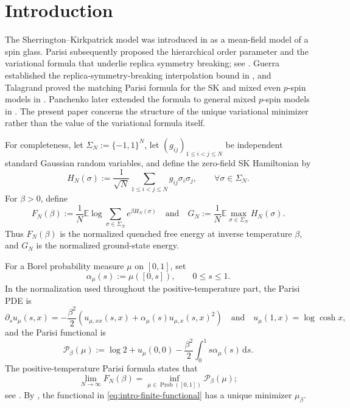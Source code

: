 \documentclass[10pt]{amsart}
\theoremstyle{definition}
\theoremstyle{remark}
\numberwithin{equation}{section}
\newcommand{\E}{\mathbb E}
\newcommand{\1}{\mathbf 1}
\newcommand{\dd}{\,\mathrm d}
\begin{document}
\enlargethispage{8pt}
\tableofcontents

\section{Introduction}
\label{sec:introduction}

The Sherrington--Kirkpatrick model was introduced in \cite{SherringtonKirkpatrick1975} as a mean-field model of a spin glass. Parisi subsequently proposed the hierarchical order parameter and the variational formula that underlie replica symmetry breaking; see \cite{Parisi1979}. Guerra established the replica-symmetry-breaking interpolation bound in \cite[Theorem 3]{Guerra2003}, and Talagrand proved the matching Parisi formula for the SK and mixed even $p$-spin models in \cite[Theorem 1.1]{Talagrand2006}. Panchenko later extended the formula to general mixed $p$-spin models in \cite[Theorem 1]{Panchenko2014}. The present paper concerns the structure of the unique variational minimizer rather than the value of the variational formula itself.

For completeness, let $\Sigma_N:=\{-1,1\}^N$, let $(g_{ij})_{1\leq i<j\leq N}$ be independent standard Gaussian random variables, and define the zero-field SK Hamiltonian by
\begin{equation*}
 H_N(\sigma):=\frac1{\sqrt N}\sum_{1\leq i<j\leq N}g_{ij}\sigma_i\sigma_j,
 \qquad \forall\sigma\in\Sigma_N.
\end{equation*}
For $\beta>0$, define
\begin{equation*}
 F_N(\beta):=\frac1N\E\log\sum_{\sigma\in\Sigma_N}e^{\beta H_N(\sigma)}
 \quad\text{and}\quad
 G_N:=\frac1N\E\max_{\sigma\in\Sigma_N}H_N(\sigma).
\end{equation*}
Thus $F_N(\beta)$ is the normalized quenched free energy at inverse temperature $\beta$, and $G_N$ is the normalized ground-state energy.

For a Borel probability measure $\mu$ on $[0,1]$, set
\begin{equation*}
\alpha_\mu(s):=\mu([0,s]),
\qquad
0\leq s\leq1.
\end{equation*}
In the normalization used throughout the positive-temperature part, the Parisi PDE is
\begin{equation*}
\partial_su_\mu(s,x)
=-\frac{\beta^2}{2}\left(u_{\mu,xx}(s,x)+\alpha_\mu(s)u_{\mu,x}(s,x)^2\right)
\quad\text{and}\quad
u_\mu(1,x)=\log\cosh x,
\end{equation*}
and the Parisi functional is
\begin{equation}
\mathcal P_\beta(\mu)
:=\log2+u_\mu(0,0)-\frac{\beta^2}{2}\int_0^1s\alpha_\mu(s)\dd s.
\label{eq:intro-finite-functional}
\end{equation}
The positive-temperature Parisi formula states that
\begin{equation*}
 \lim_{N\to\infty}F_N(\beta)
 =\inf_{\mu\in\operatorname{Prob}([0,1])}\mathcal P_\beta(\mu);
\end{equation*}
see \cite[Theorem~1.1]{Talagrand2006}. By \cite[Theorem 1]{AuffingerChenUnique}, the functional in \eqref{eq:intro-finite-functional} has a unique minimizer $\mu_\beta$.
\end{document}
